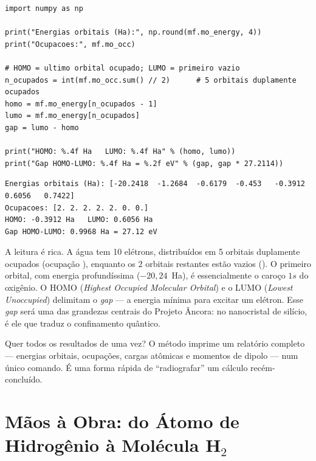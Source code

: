 \begin{lstlisting}[style=python,caption={Lendo orbitais, ocupações e o \emph{gap} HOMO--LUMO.},label={lst:orbitais}]
import numpy as np

print("Energias orbitais (Ha):", np.round(mf.mo_energy, 4))
print("Ocupacoes:", mf.mo_occ)

# HOMO = ultimo orbital ocupado; LUMO = primeiro vazio
n_ocupados = int(mf.mo_occ.sum() // 2)      # 5 orbitais duplamente ocupados
homo = mf.mo_energy[n_ocupados - 1]
lumo = mf.mo_energy[n_ocupados]
gap = lumo - homo

print("HOMO: %.4f Ha   LUMO: %.4f Ha" % (homo, lumo))
print("Gap HOMO-LUMO: %.4f Ha = %.2f eV" % (gap, gap * 27.2114))
\end{lstlisting}

\begin{lstlisting}[style=console]
Energias orbitais (Ha): [-20.2418  -1.2684  -0.6179  -0.453   -0.3912   0.6056   0.7422]
Ocupacoes: [2. 2. 2. 2. 2. 0. 0.]
HOMO: -0.3912 Ha   LUMO: 0.6056 Ha
Gap HOMO-LUMO: 0.9968 Ha = 27.12 eV
\end{lstlisting}

\noindent
A leitura é rica. A água tem 10 elétrons, distribuídos em 5 orbitais duplamente
ocupados (ocupação ), enquanto os 2 orbitais restantes estão vazios
(). O primeiro orbital, com energia profundíssima ($-20{,}24$~Ha),
é essencialmente o caroço $1s$ do oxigênio. O HOMO
(\emph{Highest Occupied Molecular Orbital}) e o LUMO (\emph{Lowest Unoccupied})
delimitam o \emph{gap} --- a energia mínima para excitar um elétron. Esse \emph{gap}
será uma das grandezas centrais do Projeto Âncora: no nanocristal de silício, é
ele que traduz o confinamento quântico.

\begin{caixadica}
Quer todos os resultados de uma vez? O método  imprime um
relatório completo --- energias orbitais, ocupações, cargas atômicas e momentos de
dipolo --- num único comando. É uma forma rápida de ``radiografar'' um cálculo
recém-concluído.
\end{caixadica}

\section{Mãos à Obra: do Átomo de Hidrogênio à Molécula H$_2$}
\label{sec:maos2}

